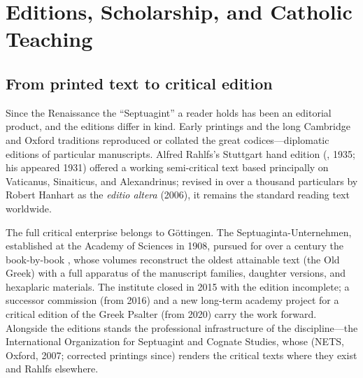 \section{Editions, Scholarship, and Catholic Teaching}

\subsection{From printed text to critical edition}

Since the Renaissance the ``Septuagint'' a reader holds has been an
editorial product, and the editions differ in kind. Early printings and
the long Cambridge and Oxford traditions reproduced or collated the great
codices---diplomatic editions of particular manuscripts. Alfred Rahlfs's
Stuttgart hand edition (, 1935; his  appeared 1931) offered a working semi-critical text based
principally on Vaticanus, Sinaiticus, and Alexandrinus; revised in over a
thousand particulars by Robert Hanhart as the \textit{editio altera}
(2006), it remains the standard reading text
worldwide.

The full critical enterprise belongs to G\"ottingen. The
Septuaginta-Unternehmen, established at the Academy of Sciences in 1908,
pursued for over a century the book-by-book , whose volumes reconstruct the oldest attainable
text (the Old Greek) with a full apparatus of the manuscript families,
daughter versions, and hexaplaric materials. The institute closed in 2015
with the edition incomplete; a successor commission (from 2016) and a new
long-term academy project for a critical edition of the Greek Psalter
(from 2020) carry the work forward. Alongside the editions stands the professional
infrastructure of the discipline---the International Organization for
Septuagint and Cognate Studies, whose  (NETS, Oxford, 2007; corrected printings since) renders
the critical texts where they exist and Rahlfs
elsewhere.

